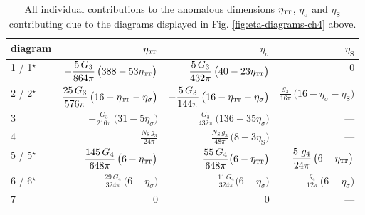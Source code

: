 \documentclass[11pt]{book}
\newcommand\TTspace{ -1pt }
\newcommand\etaTT{ \eta_{\scriptscriptstyle{\mathrm{T\hspace{\TTspace}T}}} }
\newcommand\etaS{ \eta_{\scriptscriptstyle{\mathrm{S}}} }
\newcommand\NS{ N_{\scriptscriptstyle{\mathrm{S}}} }
\numberwithin{equation}{chapter}
\begin{document}
{
  \setlength{\extrarowheight}{10pt}
  \begin{table}[p]
    \begin{center}
      \begin{tabular}{ l@{\hskip 5mm} r@{\hskip 7mm} r@{\hskip 7mm} r }
        \toprule
        diagram        &  $\etaTT$ & $\eta_\sigma$ & $\etaS$ \\
        \midrule
        1 / 1$^\star$  &  $\displaystyle -\frac{5 \, G_3}{864 \pi} \, \big( 388-53\etaTT \big)$
                       &  $\displaystyle \frac{5 \,  G_3}{432\pi} \, \big(40-23\etaTT \big)$
                       &  $0$                                              \\
        2 / 2$^\star$  &  $\displaystyle \frac{25 \, G_3}{576 \pi} \, \big(16-\etaTT-\eta_{\sigma} \big)$
                       &  $\displaystyle - \frac{5 \,  G_3}{144\pi} \, \big(16-\etaTT- \eta_{\sigma} \big)$
                       &  $\displaystyle \frac{g_3}{16\pi} \, \big(16-\eta_{\sigma}-\etaS \big)$ \\
        3              &  $\displaystyle -\frac{G_3}{216 \pi} \, \big(31-5\eta_{\sigma} \big)$
                       &  $\displaystyle \frac{G_3}{432\pi} \, \big(136 - 35 \eta_{\sigma} \big)$
                       &  ---                                              \\
        4              &  $\displaystyle \frac{\NS \, g_3}{24 \pi}$
                       &  $\displaystyle \frac{\NS \, g_3}{48 \pi} \, \big(8-3\etaS \big)$
                       &  ---                                              \\
        5 / 5$^\star$  &  $\displaystyle \frac{145 \, G_4}{648 \pi} \, \big(6-\etaTT  \big)$
                       &  $\displaystyle \frac{55 \, G_4}{648 \pi}\big(6-\etaTT \big)$
                       &  $\displaystyle \frac{5 \ g_4}{24\pi} \, \big(6-\etaTT \big)$            \\
        6 / 6$^\star$  &  $\displaystyle -\frac{29 \, G_4}{324 \pi} \, \big(6-\eta_{\sigma} \big)$
                       &  $\displaystyle -\frac{11 \, G_4}{324 \pi} \big(6-\eta_{\sigma} \big)$
                       &  $\displaystyle -\frac{g_4}{12 \pi} \, \big(6-\eta_{\sigma} \big)$       \\
        7              &  $0$
                       &  $0$
                       &  ---                                              \\
        \bottomrule
      \end{tabular}
    \end{center}
    \caption[Coordinates and critical exponents of fixed points in perturbative approximation]
    {
      All individual contributions to the anomalous dimensions $\etaTT$, $\eta_\sigma$ and $\etaS$
      contributing due to the diagrams displayed in Fig. \ref{fig:eta-diagrams-ch4} above.
    }
    \label{tab:eta-results}
  \end{table}
}
\end{document}
